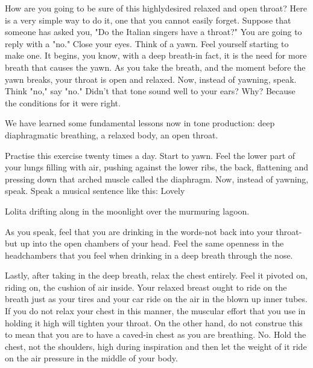 \documentclass[10pt]{article}
\begin{document}
How are you going to be sure of this highlydesired relaxed and open throat? Here is a very simple way to do it, one that you cannot easily forget. Suppose that someone has asked you, "Do the Italian singers have a throat?" You are going to reply with a "no." Close your eyes. Think of a yawn. Feel yourself starting to make one. It begins, you know, with a deep breath-in fact, it is the need for more breath that causes the yawn. As you take the breath, and the moment before the yawn breaks, your throat is open and relaxed. Now, instead of yawning, speak. Think "no," say "no." Didn't that tone sound well to your ears? Why? Because the conditions for it were right.

We have learned some fundamental lessons now in tone production: deep diaphragmatic breathing, a relaxed body, an open throat.

Practise this exercise twenty times a day. Start to yawn. Feel the lower part of your lungs filling with air, pushing against the lower ribs, the back, flattening and pressing down that arched muscle called the diaphragm. Now, instead of yawning, speak. Speak a musical sentence like this: Lovely

Lolita drifting along in the moonlight over the murmuring lagoon.

As you speak, feel that you are drinking in the words-not back into your throat-but up into the open chambers of your head. Feel the same openness in the headchambers that you feel when drinking in a deep breath through the nose.

Lastly, after taking in the deep breath, relax the chest entirely. Feel it pivoted on, riding on, the cushion of air inside. Your relaxed breast ought to ride on the breath just as your tires and your car ride on the air in the blown up inner tubes. If you do not relax your chest in this manner, the muscular effort that you use in holding it high will tighten your throat. On the other hand, do not construe this to mean that you are to have a caved-in chest as you are breathing. No. Hold the chest, not the shoulders, high during inspiration and then let the weight of it ride on the air pressure in the middle of your body.
\end{document}
